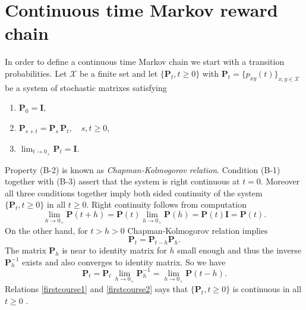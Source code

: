 \vspace{4 mm}
\section{Continuous time Markov reward chain}
\vspace{2 mm}
In order to define a continuous time Markov chain we start with a transition probabilities. Let $\mathcal{X}$ be a finite set and let $\{\bm{P}_t,t\geq 0\}$ with $\bm{P}_t=\{p_{xy}(t)\}_{x,y\in\mathcal{X}}$ be a system of stochastic matrixes satisfying
\begin{enumerate}[(B-1)]
\setlength\itemindent{15pt}
 \item $\bm{P}_0 =\bm{I}$,
 \item $\bm{P}_{s+t}=\bm{P}_s\,\bm{P}_t, \quad s,t\geq0$, 
 \item $\lim_{t\rightarrow0_+} \bm{P}_t = \bm{I}$.
\end{enumerate}
Property (B-2) is known as {\em Chapman-Kolmogorov relation}. Condition (B-1) together with (B-3)  assert that the system is right continuous at $t=0$. Moreover all three conditions together imply both sided continuity of the system $\{\bm{P}_t,t\geq 0\}$ in all $t\geq0$. Right continuity follows from computation
\begin{equation} 
\label{firstcourse1}
\lim_{h\rightarrow 0_+} \bm{P}(t+h)=\bm{P}(t)\lim_{h\rightarrow 0_+} \bm{P}(h)=\bm{P}(t)\bm{I}=\bm{P}(t). 
\end{equation}
On the other hand, for $t>h>0$ Chapman-Kolmogorov relation implies
\[\bm{P}_t=\bm{P}_{t-h}\bm{P}_h.\]
The matrix $\bm{P}_h$ is near to identity matrix for $h$ small enough and thus the inverse $\bm{P}_h^{-1}$ exists and also converges to identity matrix. So we have
\begin{equation} 
\label{firstcourse2}
\bm{P}_t=\bm{P}_t\,\lim_{h\rightarrow 0_+} \bm{P}_h^{-1}= \lim_{h\rightarrow 0_+} \bm{P}(t-h).
\end{equation}
Relations \eqref{firstcourse1} and  \eqref{firstcourse2} says that $\{\bm{P}_t,t\geq 0\}$ is continuous in all $t\geq0$ .

